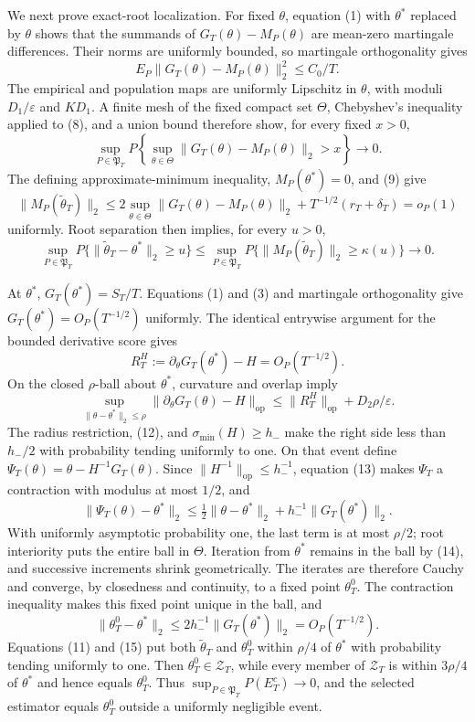 We next prove exact-root localization.  For fixed \(\theta\), equation (1)
with \(\theta^*\) replaced by \(\theta\) shows that the summands of
\(G_T(\theta)-M_P(\theta)\) are mean-zero martingale differences.  Their
norms are uniformly bounded, so martingale orthogonality gives
\[
 E_P\|G_T(\theta)-M_P(\theta)\|_2^2\le C_0/T.
\tag{8}
\]
The empirical and population maps are uniformly Lipschitz in \(\theta\),
with moduli \(D_1/\varepsilon\) and \(KD_1\).  A finite mesh of the fixed
compact set \(\Theta\), Chebyshev's inequality applied to (8), and a union
bound therefore show, for every fixed \(x>0\),
\[
 \sup_{P\in\mathfrak P_T}P\left\{\sup_{\theta\in\Theta}
 \|G_T(\theta)-M_P(\theta)\|_2>x\right\}\longrightarrow0.
\tag{9}
\]
The defining approximate-minimum inequality, \(M_P(\theta^*)=0\), and (9)
give
\[
 \|M_P(\widetilde\theta_T)\|_2
 \le2\sup_{\theta\in\Theta}\|G_T(\theta)-M_P(\theta)\|_2
 +T^{-1/2}(r_T+\delta_T)=o_P(1)
\tag{10}
\]
uniformly.  Root separation then implies, for every \(u>0\),
\[
 \sup_{P\in\mathfrak P_T}P\{\|\widetilde\theta_T-\theta^*\|_2\ge u\}
 \le\sup_{P\in\mathfrak P_T}P\{\|M_P(\widetilde\theta_T)\|_2
 \ge\kappa(u)\}\longrightarrow0.
\tag{11}
\]

At \(\theta^*\), \(G_T(\theta^*)=S_T/T\).  Equations (1) and (3) and
martingale orthogonality give \(G_T(\theta^*)=O_P(T^{-1/2})\) uniformly.
The identical entrywise argument for the bounded derivative score gives
\[
 R_T^H:=\partial_\theta G_T(\theta^*)-H=O_P(T^{-1/2}).
\tag{12}
\]
On the closed \(\rho\)-ball about \(\theta^*\), curvature and overlap imply
\[
 \sup_{\|\theta-\theta^*\|_2\le\rho}
 \|\partial_\theta G_T(\theta)-H\|_{\mathrm{op}}
 \le\|R_T^H\|_{\mathrm{op}}+D_2\rho/\varepsilon.
\tag{13}
\]
The radius restriction, (12), and \(\sigma_{\min}(H)\ge h_-\) make the
right side less than \(h_-/2\) with probability tending uniformly to one.
On that event define \(\Psi_T(\theta)=\theta-H^{-1}G_T(\theta)\).  Since
\(\|H^{-1}\|_{\mathrm{op}}\le h_-^{-1}\), equation (13) makes \(\Psi_T\)
a contraction with modulus at most \(1/2\), and
\[
 \|\Psi_T(\theta)-\theta^*\|_2
 \le\tfrac12\|\theta-\theta^*\|_2
 +h_-^{-1}\|G_T(\theta^*)\|_2.
\tag{14}
\]
With uniformly asymptotic probability one, the last term is at most
\(\rho/2\); root interiority puts the entire ball in \(\Theta\).  Iteration
from \(\theta^*\) remains in the ball by (14), and successive increments
shrink geometrically.  The iterates are therefore Cauchy and converge, by
closedness and continuity, to a fixed point \(\theta_T^0\).  The contraction
inequality makes this fixed point unique in the ball, and
\[
 \|\theta_T^0-\theta^*\|_2
 \le2h_-^{-1}\|G_T(\theta^*)\|_2=O_P(T^{-1/2}).
\tag{15}
\]
Equations (11) and (15) put both \(\widetilde\theta_T\) and \(\theta_T^0\)
within \(\rho/4\) of \(\theta^*\) with probability tending uniformly to one.
Then \(\theta_T^0\in\mathcal Z_T\), while every member of \(\mathcal Z_T\)
is within \(3\rho/4\) of \(\theta^*\) and hence equals \(\theta_T^0\).
Thus \(\sup_{P\in\mathfrak P_T}P(E_T^c)\to0\), and the selected estimator
equals \(\theta_T^0\) outside a uniformly negligible event.

